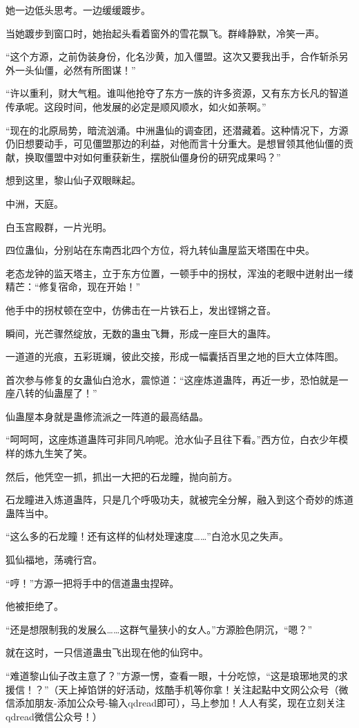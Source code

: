 \begin{this_body}
她一边低头思考。一边缓缓踱步。

当她踱步到窗口时，她抬起头看着窗外的雪花飘飞。群峰静默，冷笑一声。

“这个方源，之前伪装身份，化名沙黄，加入僵盟。这次又要我出手，合作斩杀另外一头仙僵，必然有所图谋！”

“许以重利，财大气粗。谁叫他抢夺了东方一族的许多资源，又有东方长凡的智道传承呢。这段时间，他发展的必定是顺风顺水，如火如荼啊。”

“现在的北原局势，暗流汹涌。中洲蛊仙的调查团，还潜藏着。这种情况下，方源仍旧想要动手，可见僵盟那边的利益，对他而言十分重大。是想冒领其他仙僵的贡献，换取僵盟中对如何重获新生，摆脱仙僵身份的研究成果吗？”

想到这里，黎山仙子双眼眯起。

中洲，天庭。

白玉宫殿群，一片光明。

四位蛊仙，分别站在东南西北四个方位，将九转仙蛊屋监天塔围在中央。

老态龙钟的监天塔主，立于东方位置，一顿手中的拐杖，浑浊的老眼中迸射出一缕精芒：“修复宿命，现在开始！”

他手中的拐杖顿在空中，仿佛击在一片铁石上，发出铿锵之音。

瞬间，光芒骤然绽放，无数的蛊虫飞舞，形成一座巨大的蛊阵。

一道道的光痕，五彩斑斓，彼此交接，形成一幅囊括百里之地的巨大立体阵图。

首次参与修复的女蛊仙白沧水，震惊道：“这座炼道蛊阵，再近一步，恐怕就是一座八转的仙蛊屋了！”

仙蛊屋本身就是蛊修流派之一阵道的最高结晶。

“呵呵呵，这座炼道蛊阵可非同凡响呢。沧水仙子且往下看。”西方位，白衣少年模样的炼九生笑了笑。

然后，他凭空一抓，抓出一大把的石龙瞳，抛向前方。

石龙瞳进入炼道蛊阵，只是几个呼吸功夫，就被完全分解，融入到这个奇妙的炼道蛊阵当中。

“这么多的石龙瞳！还有这样的仙材处理速度……”白沧水见之失声。

狐仙福地，荡魂行宫。

“哼！”方源一把将手中的信道蛊虫捏碎。

他被拒绝了。

“还是想限制我的发展么……这群气量狭小的女人。”方源脸色阴沉，“嗯？”

就在这时，一只信道蛊虫飞出现在他的仙窍中。

“难道黎山仙子改主意了？”方源一愣，查看一眼，十分吃惊，“这是琅琊地灵的求援信！？”（天上掉馅饼的好活动，炫酷手机等你拿！关注起點中文网公众号（微信添加朋友-添加公众号-输入qdread即可），马上参加！人人有奖，现在立刻关注qdread微信公众号！）

\end{this_body}

